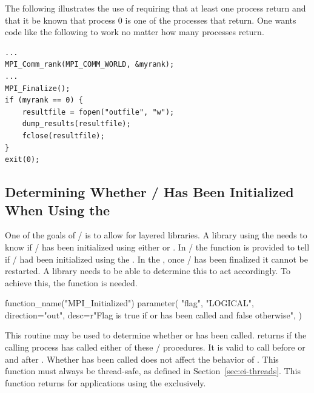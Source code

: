 \begin{example}\label{example:finalize-rank0}
%
The following illustrates the use of requiring that at least one
process return and that it be known that process 0 is one of the processes
that return.  One wants code like the following to work no matter how many
processes return.

\begin{lstlisting}[language={[MPI]C}]
...
MPI_Comm_rank(MPI_COMM_WORLD, &myrank);
...
MPI_Finalize();
if (myrank == 0) {
    resultfile = fopen("outfile", "w");
    dump_results(resultfile);
    fclose(resultfile);
}
exit(0);
\end{lstlisting}
\end{example}

\subsection{Determining Whether \texorpdfstring{\mpi/}{MPI} Has Been Initialized When Using the \texorpdfstring{\wpm}{World Model}}

One of the goals of \mpi/ is to allow for layered libraries.  A library
using the \wpm{} needs to know if \mpi/ has been initialized using either  or .
In \mpi/ the function  is
provided to tell if \mpi/ had been initialized using the \wpm{}.
In the \wpm{}, once \mpi/ has been finalized it
cannot be restarted.  A library needs to be
able to determine this to act accordingly.  To achieve this, the
function  is needed.

\begin{mpi-binding}
    function_name("MPI_Initialized")
    parameter(
        "flag",
        "LOGICAL",
        direction="out",
        desc=r"Flag is true if  or  has been called and false otherwise",
    )
\end{mpi-binding}

This routine may be used to determine whether  or  has been
called.
 returns  if the calling process has
called either of these \MPI/ procedures. It is valid to call 
before  or  and after .
Whether  has been
called does not affect the behavior of .
This function must always be thread-safe, as defined in
Section~\ref{sec:ei-threads}.  This function returns  for
applications using the \spm{} exclusively.

